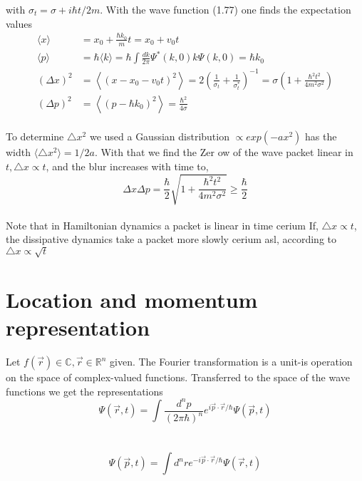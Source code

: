 with $\sigma_t=\sigma+i\hbar t/2m$. With the wave function (1.77) one finds the expectation values
\\
\begin{equation}
\begin{aligned}\langle x\rangle &= x_{0}+\frac{\hbar k_{0}}{m} t=x_{0}+v_{0} t \\\langle p\rangle &=\hbar\langle k\rangle=\hbar \int \frac{d k}{2 \pi} \Psi^{*}(k, 0) k \Psi(k, 0)=\hbar k_{0} \\(\Delta x)^{2} &=\left\langle\left(x-x_{0}-v_{0} t\right)^{2}\right\rangle= 2\left(\frac{1}{\sigma_{t}}+\frac{1}{\sigma_{t}^{*}}\right)^{-1}=\sigma\left(1+\frac{\hbar^{2} t^{2}}{4 m^{2} \sigma^{2}}\right) \\(\Delta p)^{2} &=\left\langle\left(p-\hbar k_{0}\right)^{2}\right\rangle=\frac{\hbar^{2}}{4 \sigma} \end{aligned}
\end{equation}\\
To determine $\triangle x^2$ we used a Gaussian distribution $\varpropto exp(-ax^2)$ has the width $\langle \triangle x^2 \rangle=1/2a$. With that we find the Zer
ow
of the wave packet linear in $t,\triangle x\varpropto t$, and the blur increases with time
to,
\\
\begin{equation}
\Delta x \Delta p=\frac{\hbar}{2} \sqrt{1+\frac{\hbar^{2} t^{2}}{4 m^{2} \sigma^{2}}} \geq \frac{\hbar}{2}
\end{equation}\\
Note that in Hamiltonian dynamics a packet is linear in time
cerium
If, $\triangle x\varpropto t$, the dissipative dynamics take a packet more slowly
cerium
asl, according to $\triangle x\varpropto \sqrt{t}$
\section{Location and momentum representation}
Let $f(\vec{r})\in \mathbb{C},\vec{r}\in\mathbb{R}^n$ given. The Fourier transformation
is a unit-is operation on the space of complex-valued functions.
Transferred to the space of the wave functions we get the representations
\\
\begin{equation}
\Psi(\vec{r}, t)=\int \frac{d^{n} p}{(2 \pi \hbar)^{n}} e^{i \vec{p} \cdot \vec{r} / \hbar} \Psi(\vec{p}, t)
\end{equation}\\
\\
\begin{equation}
\Psi(\vec{p}, t)=\int d^{n} r e^{-i \vec{p} \cdot \vec{r} / \hbar} \Psi(\vec{r}, t)
\end{equation}\\

